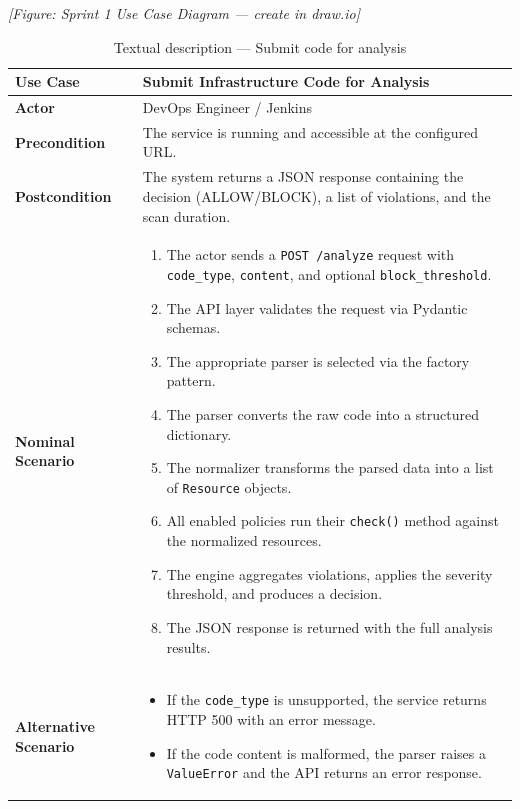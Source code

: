 \textit{[Figure: Sprint 1 Use Case Diagram — create in draw.io]}

\vspace{0.3cm}

\begin{table}[H]
\centering
\caption{Textual description — Submit code for analysis}
\label{tab:sprint1-usecase-text}
\begin{tabular}{|p{3.5cm}|p{9.5cm}|}
\hline
\textbf{Use Case} & Submit Infrastructure Code for Analysis \\
\hline
\textbf{Actor} & DevOps Engineer / Jenkins \\
\hline
\textbf{Precondition} & The service is running and accessible at the configured URL. \\
\hline
\textbf{Postcondition} & The system returns a JSON response containing the decision (ALLOW/BLOCK), a list of violations, and the scan duration. \\
\hline
\textbf{Nominal Scenario} &
\begin{enumerate}[nosep]
    \item The actor sends a \texttt{POST /analyze} request with \texttt{code\_type}, \texttt{content}, and optional \texttt{block\_threshold}.
    \item The API layer validates the request via Pydantic schemas.
    \item The appropriate parser is selected via the factory pattern.
    \item The parser converts the raw code into a structured dictionary.
    \item The normalizer transforms the parsed data into a list of \texttt{Resource} objects.
    \item All enabled policies run their \texttt{check()} method against the normalized resources.
    \item The engine aggregates violations, applies the severity threshold, and produces a decision.
    \item The JSON response is returned with the full analysis results.
\end{enumerate} \\
\hline
\textbf{Alternative Scenario} &
\begin{itemize}[nosep]
    \item If the \texttt{code\_type} is unsupported, the service returns HTTP 500 with an error message.
    \item If the code content is malformed, the parser raises a \texttt{ValueError} and the API returns an error response.
\end{itemize} \\
\hline
\end{tabular}
\end{table}

